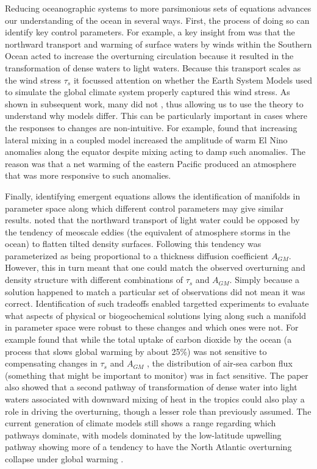 \documentclass{article}
\begin{document}
Reducing oceanographic systems to more parsimonious sets of equations advances our understanding of the ocean in several ways. First, the process of doing so can identify key control parameters. For example, a key insight from \cite{gnanadesikan1999simple} was that the northward transport and warming of surface waters by winds within the Southern Ocean acted to increase the overturning circulation because it resulted in the transformation of dense waters to light waters. Because this transport scales as the wind stress $\tau_s$  it focussed attention on whether the Earth System Models used to simulate the global climate system properly captured this wind stress. As shown in subsequent work, many did not \citep{russell2006southern}, thus allowing us to use the theory to understand why models differ. This can be particularly important in cases where the responses to changes are non-intuitive. For example, \cite{gnanadesikan2017impact} found that increasing lateral mixing in a coupled model increased the amplitude of warm El Nino anomalies along the equator despite mixing acting to damp such anomalies. The reason was that a net warming of the eastern Pacific produced an atmosphere that was more responsive to such anomalies.  

Finally, identifying emergent equations allows the identification of manifolds in parameter space along which different control parameters may give similar results. \cite{gnanadesikan1999simple} noted that the northward transport of light water could be opposed by the tendency of meoscale eddies (the equivalent of atmosphere storms in the ocean) to flatten tilted density surfaces. Following \cite{mcwilliams1990linear} this tendency was parameterized as being proportional to a thickness diffusion coefficient $A_{GM}$. However, this in turn meant that one could match the observed overturning and density structure with different combinations of $\tau_s$ and $A_{GM}$. Simply because a solution happened to match a particular set of observations did not mean it was correct. Identification of such tradeoffs enabled targetted experiments to evaluate what aspects of physical or biogeochemical solutions lying along such a manifold in parameter space were robust to these changes and which ones were not. For example \cite{mignone2006central} found that while the total uptake of carbon dioxide by the ocean (a process that slows global warming by about 25\%) was not sensitive to compensating changes in 
$\tau_s$ and  $A_{GM}$  
, the distribution of air-sea carbon flux (something that might be important to monitor) was in fact sensitive. The \cite{gnanadesikan1999simple} paper also showed that a second pathway of transformation of dense water into light waters associated with downward mixing of heat in the tropics could also play a role in driving the overturning, though a lesser role than previously assumed. The current generation of climate models still shows a range regarding which pathways dominate, with models dominated by the low-latitude upwelling pathway showing more of a tendency to have the North Atlantic overturning collapse under global warming \citep{baker2024wind}. 
\end{document}
